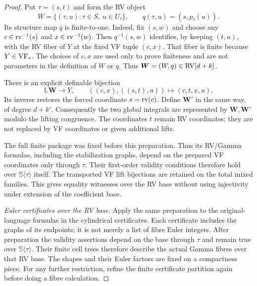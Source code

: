 \begin{proof}
Put $\tau=(s,t)$ and form the RV object
\[
 W=\{(\tau,u):\tau\in S,\ u\in U_\tau\},\qquad
 q(\tau,u)=(s,p_\tau(u)).
\]
Its structure map $q$ is finite-to-one.
Indeed, fix $(s,w)$ and choose any
$c\in\operatorname{rv}^{-1}(s)$ and $x\in\operatorname{rv}^{-1}(w)$.
Then $q^{-1}(s,w)$ identifies, by keeping $(t,u)$, with the
RV fiber of $Y$ at the fixed VF tuple $(c,x)$.
That fiber is finite because $Y\in\mathrm{VF}_*$.
The choices of $c,x$ are used only to prove finiteness and
are not parameters in the definition of $W$ or $q$.
Thus $\bm W=(W,q)\in\mathrm{RV}[d+k]$.

There is an explicit definable bijection
\[
 \mathbb L\bm W\longrightarrow Y,\qquad
 ((c,x),((s,t),u))\longmapsto(c,t,x,u).
\]
Its inverse restores the forced coordinate $s=\operatorname{rv}(c)$.
Define $\bm W'$ in the same way, of degree $d+k'$.
Consequently the two global integrals are represented by
$\bm W,\bm W'$ modulo the lifting congruence.
The coordinates $t$ remain RV coordinates; they are not
replaced by VF coordinates or given additional lifts.

The full finite package was fixed before this preparation. Thus its RV/Gamma
formulas, including the stabilization graphs, depend on the prepared VF
coordinates only through $\tau$. Their first-order validity conditions
therefore hold over $\mathbb S\langle\tau\rangle$ itself. The transported
VF lift bijections are retained on the total mixed families. This gives
equality witnesses over the RV base without using injectivity under
extension of the coefficient base.

\medskip
\noindent\emph{Euler certificates over the RV base.}
Apply the same preparation to the original-language formulas in the
cylindrical certificates. Each certificate includes the graphs of its
endpoints; it is not merely a list of fibre Euler integers. After
preparation the validity assertions depend on the base through $\tau$
and remain true over $\mathbb S\langle\tau\rangle$.
Their finite cell trees therefore describe the actual Gamma fibres
over that RV base. The shapes and their Euler factors are fixed on a
compactness piece. For any further restriction, refine the finite
certificate partition again before doing a fibre calculation.


\end{proof}

